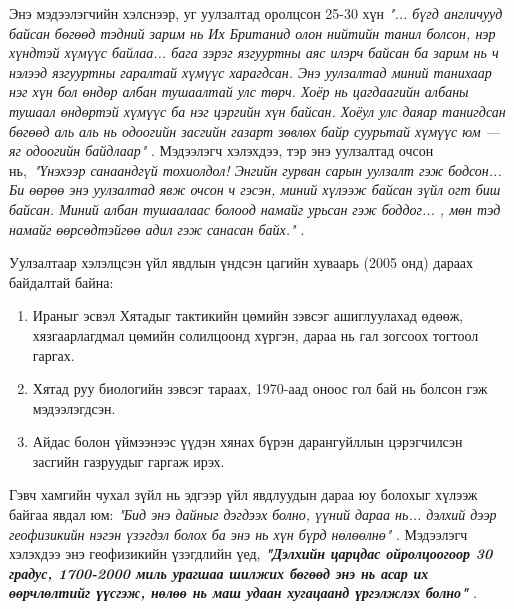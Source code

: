 \documentclass[10pt,twocolumn,letterpaper]{article}
\begin{document}
Энэ мэдээлэгчийн хэлснээр, уг уулзалтад оролцсон 25-30 хүн \textit{"... бүгд англичууд байсан бөгөөд тэдний зарим нь Их Британид олон нийтийн танил болсон, нэр хүндтэй хүмүүс байлаа... бага зэрэг язгууртны аяс илэрч байсан ба зарим нь ч нэлээд язгууртны гаралтай хүмүүс харагдсан. Энэ уулзалтад миний танихаар нэг хүн бол өндөр албан тушаалтай улс төрч. Хоёр нь цагдаагийн албаны тушаал өндөртэй хүмүүс ба нэг цэргийн хүн байсан. Хоёул улс даяар танигдсан бөгөөд аль аль нь одоогийн засгийн газарт зөвлөх байр суурьтай хүмүүс юм — яг одоогийн байдлаар"} \cite{4}. Мэдээлэгч хэлэхдээ, тэр энэ уулзалтад очсон нь,\ \textit{"Үнэхээр санаандгүй тохиолдол! Энгийн гурван сарын уулзалт гэж бодсон... Би өөрөө энэ уулзалтад явж очсон ч гэсэн, миний хүлээж байсан зүйл огт биш байсан. Миний албан тушаалаас болоод намайг урьсан гэж боддог... , мөн тэд намайг өөрсөдтэйгөө адил гэж санасан байх."} \cite{4}.

Уулзалтаар хэлэлцсэн үйл явдлын үндсэн цагийн хуваарь (2005 онд) дараах байдалтай байна:

\begin{flushleft}

\begin{enumerate}
    \item Ираныг эсвэл Хятадыг тактикийн цөмийн зэвсэг ашиглуулахад өдөөж, хязгаарлагдмал цөмийн солилцоонд хүргэн, дараа нь гал зогсоох тогтоол гаргах.
    \item Хятад руу биологийн зэвсэг тараах, 1970-аад оноос гол бай нь болсон гэж мэдээлэгдсэн.
    \item Айдас болон үймээнээс үүдэн хянах бүрэн дарангуйллын цэрэгчилсэн засгийн газруудыг гаргаж ирэх.
\end{enumerate}
\end{flushleft}

Гэвч хамгийн чухал зүйл нь эдгээр үйл явдлуудын дараа юу болохыг хүлээж байгаа явдал юм: \textit{"Бид энэ дайныг дэгдээх болно, үүний дараа нь... дэлхий дээр геофизикийн нэгэн үзэгдэл болох ба энэ нь хүн бүрд нөлөөлнө"} \cite{4}. Мэдээлэгч хэлэхдээ энэ геофизикийн үзэгдлийн үед, \textit{\textbf{"Дэлхийн царцдас ойролцоогоор 30 градус, 1700-2000 миль урагшаа шилжих бөгөөд энэ нь асар их өөрчлөлтийг үүсгэж, нөлөө нь маш удаан хугацаанд үргэлжлэх болно"}} \cite{4}.
\end{document}
